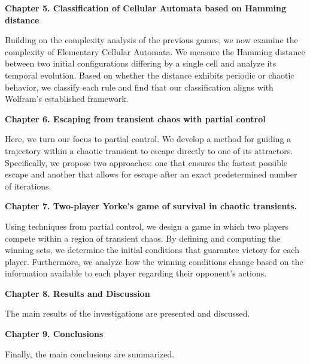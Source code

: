 \vspace{0.6cm}

{\bf  Chapter 5. Classification of Cellular Automata based on Hamming distance}

\vspace{0.6cm}

Building on the complexity analysis of the previous games, we now examine the complexity of Elementary Cellular Automata. We measure the Hamming distance between two initial configurations differing by a single cell and analyze its temporal evolution. Based on whether the distance exhibits periodic or chaotic behavior, we classify each rule and find that our classification aligns with Wolfram's established framework.

\vspace{0.6cm}

{\bf  Chapter 6. Escaping from transient chaos with partial control} 

\vspace{0.6cm}

Here, we turn our focus to partial control. We develop a method for guiding a trajectory within a chaotic transient to escape directly to one of its attractors. Specifically, we propose two approaches: one that ensures the fastest possible escape and another that allows for escape after an exact predetermined number of iterations.

\vspace{0.6cm}


{\bf  Chapter 7. Two-player Yorke's game of survival in chaotic transients.}

\vspace{0.6cm}

Using techniques from partial control, we design a game in which two players compete within a region of transient chaos. By defining and computing the winning sets, we determine the initial conditions that guarantee victory for each player. Furthermore, we analyze how the winning conditions change based on the information available to each player regarding their opponent's actions.


\vspace{0.6cm}

{\bf  Chapter 8. Results and Discussion}

\vspace{0.6cm}

The main results of the investigations are presented and discussed.


\vspace{0.6cm}

{\bf  Chapter 9. Conclusions}

\vspace{0.6cm}

Finally, the main conclusions are summarized.